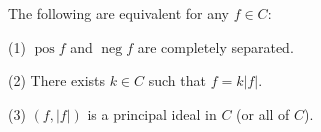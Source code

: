 The following are equivalent for any $f \in C$:

(1) $\operatorname{pos} f$ and $\operatorname{neg} f$ are completely separated.

(2) There exists $k \in C$ such that $f = k|f|$.

(3) $(f, |f|)$ is a principal ideal in $C$ (or all of $C$).
